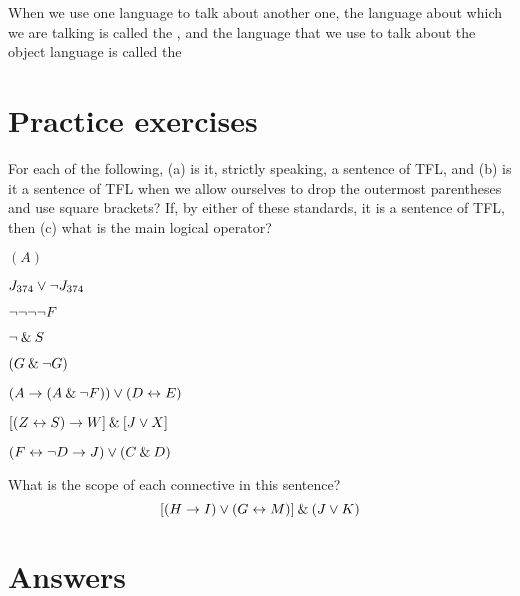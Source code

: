 \begin{notebox}
When we use one language to talk about another one, the language about which we are talking is called the , and the language that we use to talk about the object language is called the 
\end{notebox}



\section{Practice exercises}
\setcounter{ProbPart}{0}

\problempart
\label{pr.wiffTFL}
For each of the following, (a) is it, strictly speaking, a sentence of TFL, and (b) is it a sentence of TFL when we allow ourselves to drop the outermost parentheses and use square brackets? If, by either of these standards, it is a sentence of TFL, then (c) what is the main logical operator?
\begin{earg}
\item $(A)$
\item $J_{374} \vee {\neg} J_{374}$
\item ${\neg} {\neg} {\neg} {\neg} F$
\item ${\neg} \mathbin{\&} S$
\item $(G \mathbin{\&} {\neg} G)$
\item $(A \rightarrow (A \mathbin{\&} {\neg} F)) \vee (D \leftrightarrow E)$
\item $[(Z \leftrightarrow S) \rightarrow W] \mathbin{\&} [J \vee X]$
\item $(F \leftrightarrow {\neg} D \rightarrow J) \vee (C \mathbin{\&} D)$
\end{earg}


\problempart
What is the scope of each connective in this sentence?
$$[(H \rightarrow I) \vee (G \leftrightarrow M)] \mathbin{\&} (J \vee K)$$



\section{Answers}
\setcounter{ProbPart}{0}

